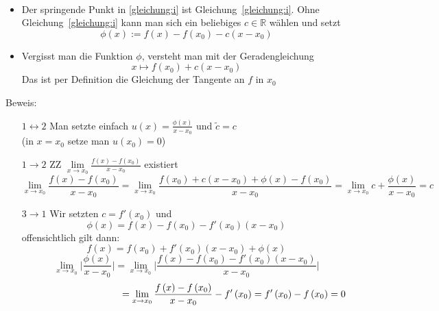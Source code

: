 \begin{Bemerkung}{
	\textbf{ }\\
	\begin{itemize}
		\item Der springende Punkt in \ref{gleichung:i} ist 
		Gleichung~\ref{gleichung:i}. Ohne Gleichung~\ref{gleichung:i} 
		kann man sich ein beliebiges $c \in \mathbb{R}$ wählen und setzt 
	\begin{equation*}
	\phi\left(x\right) := f\left(x\right) - f\left(x_0\right) - c\left(x-x_0\right)
	\end{equation*}			
	\item Vergisst man die Funktion $\phi$, versteht man mit der Geradengleichung
		\begin{equation*}
		x \mapsto f\left(x_0\right) + c\left(x-x_0\right)
		\end{equation*}
		Das ist per Definition die Gleichung der Tangente an $f$ in $x_0$
	\end{itemize}
	Beweis:
	\begin{itemize}
		\item[$1 \leftrightarrow 2$] Man setzte einfach $u\left(x\right) = \frac{\phi\left(x\right)}{x-x_0}$ und $\tilde{c} = c$ \\
		(in $x = x_0$ setze man $u\left(x_0\right) = 0$)
		\item[$1 \rightarrow 2$] ZZ $\lim\limits_{x \rightarrow x_0}{\frac{f\left(x\right)-f\left(x_0\right)}{x-x_0}}$ existiert \\
		\begin{equation*}
			\lim\limits_{x\rightarrow x_0}{\frac{f\left(x\right) - f\left(x_0\right)}{x-x_0}} = \lim\limits_{x \rightarrow x_0}{\frac{f\left(x_0\right) + c\left(x-x_0\right)+\phi\left(x\right)-f\left(x_0\right)}{x-x_0}}
			= \lim\limits_{x\rightarrow x_0}{c + \frac{\phi \left(x\right)}{x-x_0}} = c
		\end{equation*}
		\item[$3\rightarrow 1$] Wir setzten $ c = f'\left(x_0\right)$ und 
		\begin{equation*}
			\phi\left(x\right) = f\left(x\right) - f\left(x_0\right) - f'\left(x_0\right)\left(x-x_0\right)
		\end{equation*}
		offensichtlich gilt dann:
		\begin{equation*}
			f\left(x\right) = f\left(x_0\right) 
			+ f'\left(x_0\right)\left(x-x_0\right) + \phi\left(x\right)
		\end{equation*}
		\begin{equation*}
			\lim\limits_{x\rightarrow x_0}
			{\vert \frac{\phi\left(x\right)}{x-x_0}\vert} 
			= \lim\limits_{x \rightarrow x_0}
			{\vert \frac{f\left(x\right)-f\left(x_0\right)-
			f'\left(x_0\right)\left(x-x_0\right)}{x-x_0}\vert} 
			\end{equation*}
			\begin{equation*}
			\hspace{35mm}= \lim\limits_{x\rightarrow x_0}{\frac{f\left(x\right)-
			f\left(x_0\right)}{x-x_0} - f'\left(x_0\right)}
			=f'\left(x_0\right) - f\left(x_0\right) 
			=0
		\end{equation*}
	\end{itemize}
}\end{Bemerkung}
